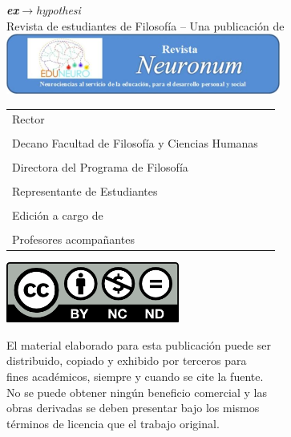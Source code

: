 {\small

\begin{center}
	{\Huge\textit{\textcolor{ehAzul1}{\textbf{ex}}\textcolor{ehAzul2}{$\rightarrow$}\textcolor{ehAzul1}{\vspace{-0.4cm}hypothesi}}}\\[0.5cm]
	Revista de estudiantes de Filosofía -- Una publicación de
	\includegraphics[width=9.021cm,height=1.984cm]{img/logo-neuronum.png}
\end{center}

\begin{longtable}[]{@{}ll@{}}
	\toprule
	\midrule
	\endhead
	Rector & \rector{}\tabularnewline
	&\tabularnewline
	Decano Facultad de Filosofía y Ciencias Humanas & \decano{}\tabularnewline
	&\tabularnewline
	Directora del Programa de Filosofía & \director{}\tabularnewline
	&\tabularnewline
	Representante de Estudiantes & \representante{}\tabularnewline
	&\tabularnewline
	Edición a cargo de & \editores{}\tabularnewline
	&\tabularnewline
	Profesores acompañantes & \profesores{}\tabularnewline
	\bottomrule
\end{longtable}

\newpage

\begin{center}
	\includegraphics[width=2.24419in,height=0.78333in]{img/CC-BY-NC-ND.png}
\end{center}

\begin{flushleft}

El material elaborado para esta publicación puede ser\\
distribuido, copiado y exhibido por terceros para\\
fines académicos, siempre y cuando se cite la fuente.\\
No se puede obtener ningún beneficio comercial y las\\
obras derivadas se deben presentar bajo los mismos\\
términos de licencia que el trabajo original.


\end{flushleft}}

